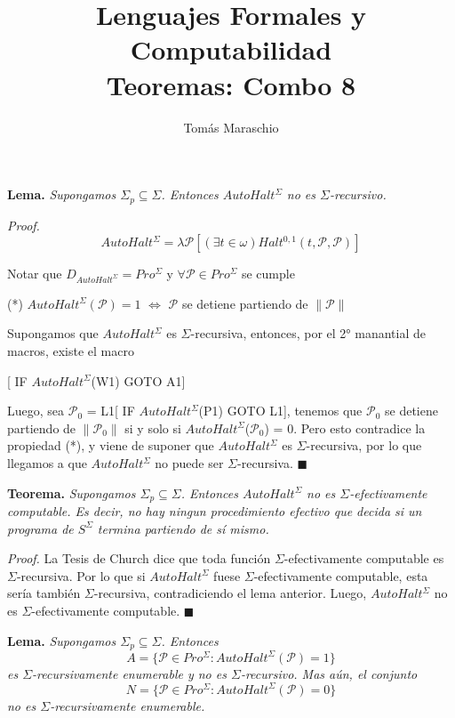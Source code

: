 \documentclass{article}
\title{Lenguajes Formales y Computabilidad \\
        \large Teoremas: Combo 8 }
\author{Tomás Maraschio}
\begin{document}
\maketitle

\textbf{Lema.} \textit{Supongamos $\Sigma_p \subseteq \Sigma$. Entonces $AutoHalt^{\Sigma}$ no es $\Sigma$-recursivo.}

\textit{Proof.}
\[
    AutoHalt^{\Sigma} = \lambda\mathcal{P}[(\exists t \in \omega) Halt^{0,1}(t, \mathcal{P}, \mathcal{P})]
\]

Notar que $D_{AutoHalt^{\Sigma}} = Pro^{\Sigma}$ y $\forall \mathcal{P} \in Pro^{\Sigma}$ se cumple
\begin{center}
    (*)  $AutoHalt^{\Sigma}(\mathcal{P}) = 1$ $\iff$ $\mathcal{P}$ se detiene partiendo de $\lVert\mathcal{P}\rVert$
\end{center}

Supongamos que $AutoHalt^{\Sigma}$ es $\Sigma$-recursiva, entonces, por el 2° manantial de macros, existe el macro
\begin{center}
    [ IF $AutoHalt^{\Sigma}$(W1) GOTO A1]
\end{center}
Luego, sea $\mathcal{P}_0$ = L1[ IF $AutoHalt^{\Sigma}$(P1) GOTO L1], tenemos que $\mathcal{P}_0$ se detiene partiendo de $\lVert\mathcal{P}_0\rVert$ si y solo si $AutoHalt^{\Sigma}$($\mathcal{P}_0$) = 0. Pero esto contradice la propiedad (*), y viene de suponer que $AutoHalt^{\Sigma}$ es $\Sigma$-recursiva, por lo que llegamos a que $AutoHalt^{\Sigma}$ no puede ser $\Sigma$-recursiva.
\hfill $\blacksquare$
\vspace{4em}


\textbf{Teorema.} \textit{Supongamos $\Sigma_p \subseteq \Sigma$. Entonces $AutoHalt^{\Sigma}$ no es $\Sigma$-efectivamente computable. Es decir, no hay ningun procedimiento efectivo que decida si un programa de $S^{\Sigma}$ termina partiendo de sí mismo.}

\textit{Proof.} La Tesis de Church dice que toda función $\Sigma$-efectivamente computable es $\Sigma$-recursiva. Por lo que si $AutoHalt^{\Sigma}$ fuese $\Sigma$-efectivamente computable, esta sería también $\Sigma$-recursiva, contradiciendo el lema anterior. Luego, $AutoHalt^{\Sigma}$ no es $\Sigma$-efectivamente computable.
\hfill $\blacksquare$
\vspace{4em}


\textbf{Lema.} \textit{Supongamos $\Sigma_p \subseteq \Sigma$. Entonces}
\[
    A = \{\mathcal{P} \in Pro^{\Sigma} : AutoHalt^{\Sigma}(\mathcal{P}) = 1\}
\]
\textit{es $\Sigma$-recursivamente enumerable y no es $\Sigma$-recursivo. Mas aún, el conjunto}
\[
    N = \{\mathcal{P} \in Pro^{\Sigma} : AutoHalt^{\Sigma}(\mathcal{P}) = 0\}
\]
\textit{no es $\Sigma$-recursivamente enumerable.}
\end{document}
